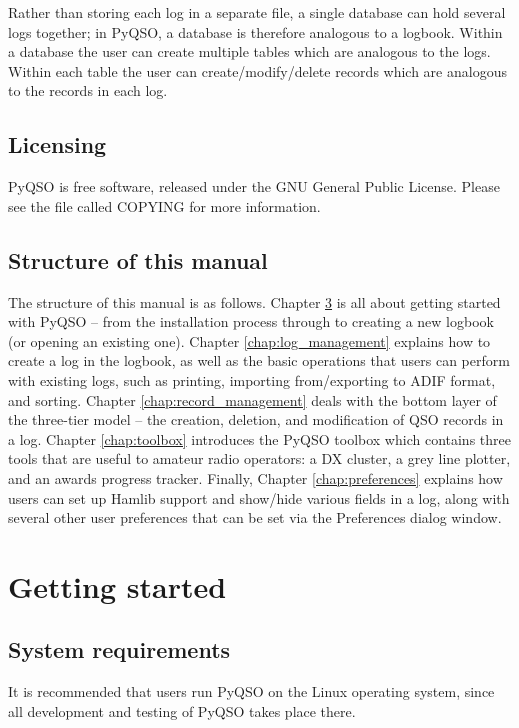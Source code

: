 \documentclass[11pt, a4paper]{report}
\begin{document}
Rather than storing each log in a separate file, a single database can hold several logs together; in PyQSO, a database is therefore analogous to a logbook. Within a database the user can create multiple tables which are analogous to the logs. Within each table the user can create/modify/delete records which are analogous to the records in each log.

\section{Licensing}
PyQSO is free software, released under the GNU General Public License. Please see the file called COPYING for more information.

\section{Structure of this manual}
The structure of this manual is as follows. Chapter \ref{chap:getting_started} is all about getting started with PyQSO -- from the installation process through to creating a new logbook (or opening an existing one). Chapter \ref{chap:log_management} explains how to create a log in the logbook, as well as the basic operations that users can perform with existing logs, such as printing, importing from/exporting to ADIF format, and sorting. Chapter \ref{chap:record_management} deals with the bottom layer of the three-tier model -- the creation, deletion, and modification of QSO records in a log. Chapter \ref{chap:toolbox} introduces the PyQSO toolbox which contains three tools that are useful to amateur radio operators: a DX cluster, a grey line plotter, and an awards progress tracker. Finally, Chapter \ref{chap:preferences} explains how users can set up Hamlib support and show/hide various fields in a log, along with several other user preferences that can be set via the Preferences dialog window.

\chapter{Getting started}\label{chap:getting_started}

\section{System requirements}
It is recommended that users run PyQSO on the Linux operating system, since all development and testing of PyQSO takes place there.
\end{document}
